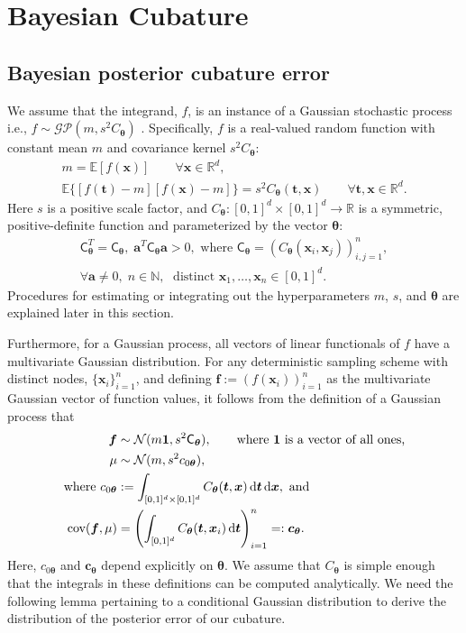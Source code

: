 \documentclass{svjour3}                     %
\newcommand{\bm}[1]{\boldsymbol{#1}}
\newcommand{\dif}[1]{\text{d}{#1}}
\newcommand{\D}[1]{\text{d}{#1}}
\newcommand{\reals}{\mathbb{R}}
\newcommand{\Ex}{\mathbb{E}}
\newcommand{\vtheta}{{\bm{\theta}}}
\newcommand{\va}{\bm{a}}
\newcommand{\vc}{\bm{c}}
\newcommand{\vf}{\bm{f}}
\newcommand{\vt}{\bm{t}}
\newcommand{\vx}{\bm{x}}
\newcommand{\vone}{\bm{1}}
\newcommand{\mC}{\mathsf{C}}
\newcommand{\mCtheta}{{\mathsf{C}_{\vtheta}}}
\newcommand{\cov}{{\textup{cov}}}
\newcommand{\calN}{\mathcal{N}}
\begin{document}
\section{Bayesian Cubature} \label{sec:BC} 


\subsection{Bayesian posterior cubature error}
\label{sec:BayesPostErr}

We assume that the integrand, $f$, is an instance of a Gaussian stochastic process  i.e., $f \sim \mathcal{GP}(m,s^2 C_\vtheta)$  \cite{BriEtal18a,Dia88a,OHa91a,Rit00a,RasGha03a}.  Specifically, $f$ is a real-valued random function with constant mean $m$ and covariance kernel $s^2C_\vtheta$:
\begin{gather*}
        m = \Ex[f(\vx)] \qquad \forall \vx \in \reals^d, \\
        \Ex\{[f(\vt) - m][f(\vx) -m]\} = s^2 C_\vtheta(\vt,\vx) \qquad \forall \vt, \vx \in \reals^d.
\end{gather*}
Here $s$ is a positive scale factor, and $C_\vtheta: [0,1]^d \times [0,1]^d \to \mathbb{R} $ is a symmetric, positive-definite function and parameterized by the vector $\vtheta$:
\begin{multline} \label{FJH:eq:CondPosDef}
\mC_\vtheta^T = \mC_\vtheta,  \; \va^T \mC_\vtheta \va > 0,  \text{ where }  \mC_\vtheta = \left(  C_\vtheta(\vx_i,\vx_j)  \right)_{i,j=1}^n,\\
 \forall \va \ne 0, \;
 n\in \mathbb{N}, \; \text{ distinct }\vx_1, \ldots, \vx_n \in [0,1]^d.
\end{multline}
Procedures for estimating or integrating out the hyperparameters $m$, $s$, and $\vtheta$ are explained later in this section.

Furthermore, for a Gaussian process, all vectors of linear functionals of $f$ have a multivariate Gaussian distribution. For any deterministic sampling scheme with distinct nodes, $\{\vx_i\}_{i=1}^n$, and defining  $\vf  := \left( f(\vx_i)\right)_{i=1}^n$ as the multivariate Gaussian vector of function values, it follows from the definition of a Gaussian process that 
\begin{subequations} \label{eqn:fGaussDist}
\begin{align}
\vf  & \sim \calN(m \vone, s^2 \mCtheta),  \qquad \text{where $\vone$ is a vector of all ones,}\\
\mu & \sim \calN(m, s^2 c_{0\vtheta}), 
\\
\text{where }
c_{0\vtheta} &:= \int_{[0,1]^{d}\times [0,1]^{d}} C_\vtheta(\vt,\vx) \, \dif{\vt} \, \dif{\vx}, \text{ and}\\
\cov(\vf, \mu) &= \left(  \int_{[0,1]^d} C_\vtheta(\vt,\vx_i) \, \D \vt \right)_{i=1}^n  =: \vc_\vtheta.
\end{align}
\end{subequations}
Here, $c_{0\vtheta}$ and $\vc_\vtheta$ depend explicitly on $\vtheta$.  We assume that $C_\vtheta$ is simple enough that the integrals in these definitions can be computed analytically.  We need the following lemma pertaining to a conditional Gaussian distribution to derive the distribution of the posterior error of our cubature. 
\end{document}
